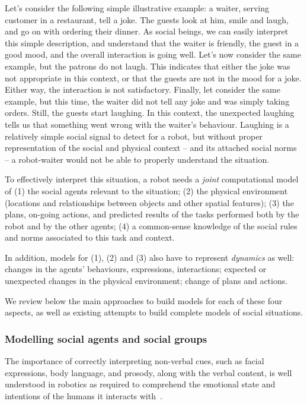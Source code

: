 Let's consider the following simple illustrative example: a waiter, serving
customer in a restaurant, tell a joke. The guests look at him, smile and laugh,
and go on with ordering their dinner. As social beings, we can easily interpret
this simple description, and understand that the waiter is friendly, the guest
in a good mood, and the overall interaction is going well. Let's now consider
the same example, but the patrons do not laugh. This indicates that either the
joke was not appropriate in this context, or that the guests are not in the mood
for a joke. Either way, the interaction is not satisfactory. Finally, let
consider the same example, but this time, the waiter did not tell any joke and
was simply taking orders. Still, the guests start laughing. In this context, the
unexpected laughing tells us that something went wrong with the waiter's
behaviour.  Laughing is a relatively simple social signal to detect for a robot,
but without proper representation of the social and physical context -- and its
attached social norms -- a robot-waiter would not be able to properly understand
the situation.

To effectively interpret this situation, a robot needs a \emph{joint}
computational model of (1) the social agents relevant to the situation; (2) the
physical environment (locations and relationships between objects and other
spatial features); (3) the plans, on-going actions, and predicted results of the
tasks performed both by the robot and by the other agents; (4) a common-sense
knowledge of the social rules and norms associated to this task and context.

In addition, models for (1), (2) and (3) also have to represent \emph{dynamics} as
well: changes in the agents' behaviours, expressions, interactions; expected or
unexpected changes in the physical environment; change of plans and actions.

We review below the main approaches to build models for each of these four
aspects, as well as existing attempts to build complete models of social situations.


\subsubsection{Modelling social agents and social groups}



The importance of correctly interpreting non-verbal cues, such as facial
expressions, body language, and prosody, along with the verbal content, is well
understood in robotics as required to comprehend the emotional state and
intentions of the humans it interacts with~\cite{breazeal2003emotion}.

